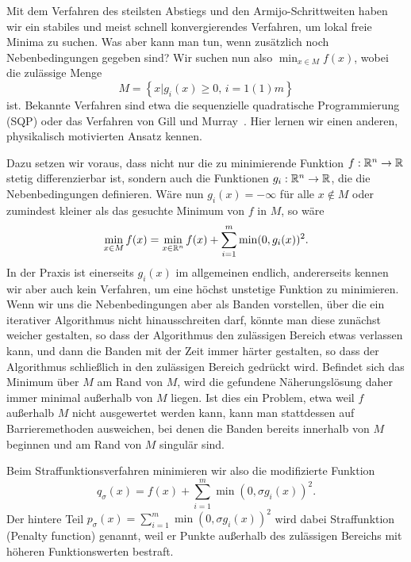 Mit dem Verfahren des steilsten Abstiegs und den Armijo-Schrittweiten
haben wir ein stabiles und meist schnell konvergierendes Verfahren, um
lokal freie Minima zu suchen. Was aber kann man tun, wenn zusätzlich
noch Nebenbedingungen gegeben sind? Wir suchen nun also $\min_{x\in M}
f(x)$, wobei die zulässige Menge
\begin{equation}
  M=\left\{ x | g_i(x)\ge 0,\,i=1(1)m \right\}
\end{equation}
ist. Bekannte Verfahren sind etwa die sequenzielle quadratische
Programmierung (SQP) oder das Verfahren von Gill und
Murray~\cite{gill78a}. Hier lernen wir einen anderen, physikalisch
motivierten Ansatz kennen.

Dazu setzen wir voraus, dass nicht nur die zu minimierende Funktion
$f:\mathbb{R}^n\to\mathbb{R}$ stetig differenzierbar ist, sondern auch die
Funktionen $g_i:\mathbb{R}^n\to\mathbb{R}$, die die Nebenbedingungen
definieren. Wäre nun $g_i(x)=-\infty$ für alle $x\notin M$ oder
zumindest kleiner als das gesuchte Minimum von $f$ in $M$, so wäre
\begin{equation}
  \min_{x\in M} f(x) = \min_{x\in\mathbb{R}^n} f(x) + \sum_{i=1}^m \min(0,
  g_i(x))^2.
\end{equation}
In der Praxis ist einerseits $g_i(x)$ im allgemeinen endlich,
andererseits kennen wir aber auch kein Verfahren, um eine höchst
unstetige Funktion zu minimieren. Wenn wir uns die Nebenbedingungen
aber als Banden vorstellen, über die ein iterativer Algorithmus nicht
hinausschreiten darf, könnte man diese zunächst weicher gestalten, so
dass der Algorithmus den zulässigen Bereich etwas verlassen kann, und
dann die Banden mit der Zeit immer härter gestalten, so dass der
Algorithmus schließlich in den zulässigen Bereich gedrückt
wird. Befindet sich das Minimum über $M$ am Rand von $M$, wird die
gefundene Näherungslösung daher immer minimal außerhalb von $M$
liegen. Ist dies ein Problem, etwa weil $f$ außerhalb $M$ nicht
ausgewertet werden kann, kann man stattdessen auf Barrieremethoden
ausweichen, bei denen die Banden bereits innerhalb von $M$ beginnen
und am Rand von $M$ singulär sind.

Beim Straffunktionsverfahren minimieren wir also die modifizierte
Funktion
\begin{equation}
  \label{eq:penalty}
  q_{\sigma}(x) = f(x) + \sum_{i=1}^m \min(0,
  \sigma g_i(x))^2.
\end{equation}
Der hintere Teil $p_{\sigma}(x) = \sum_{i=1}^m \min(0, \sigma
g_i(x))^2$ wird dabei Straffunktion (Penalty function)
genannt, weil er Punkte außerhalb des zulässigen Bereichs mit höheren
Funktionswerten bestraft.

